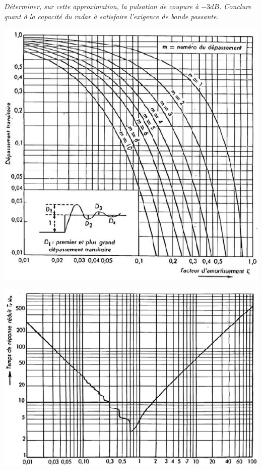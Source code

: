 \documentclass[10pt]{article}
\begin{document}
\subparagraph{}
\textit{Déterminer, sur cette approximation, la pulsation de coupure à $-3dB$. Conclure quant à la capacité du radar à satisfaire l'exigence de bande passante.}


 \begin{center}
\includegraphics[width=.8\textwidth]{images/exo1_3}

\includegraphics[width=.8\textwidth]{images/exo1_4}
\end{center}

\newpage
\end{document}
